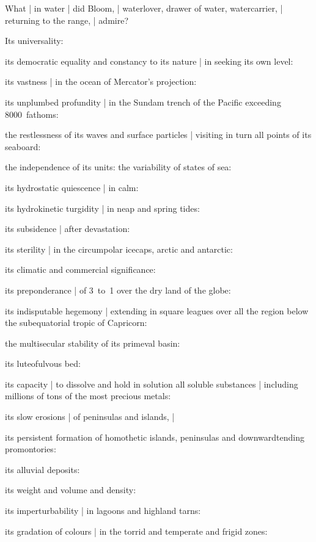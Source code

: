 What |
in water |
did Bloom, |
waterlover, drawer of water, watercarrier, |
returning to the range, |
admire?

\Household
Its universality:

\Philosophy
its democratic equality and constancy to its nature |
in seeking its own level:

\Places
its vastness |
in the ocean of Mercator's projection:

\Religious
its unplumbed profundity |
in the Sundam trench of the Pacific exceeding 8000~fathoms:

\Factual
the restlessness of its waves and surface particles |
visiting in turn all points of its seaboard:

\Memories
the independence of its units:
the variability of states of sea:

\Poetry
its hydrostatic quiescence |
in calm:

\Science
its hydrokinetic turgidity |
in neap and spring tides:

\Household
its subsidence |
after devastation:

\Memories
its sterility |
in the circumpolar icecaps, arctic and antarctic:

\Factual
its climatic and commercial significance:

\Places
its preponderance |
of 3~to~1 over the dry land of the globe:

\Religious
its indisputable hegemony |
extending in square leagues
over all the region below the subequatorial tropic of Capricorn:

\Factual
the multisecular stability of its primeval basin:

\Science
its luteofulvous bed:

\Memories
its capacity |
to dissolve and hold in solution
all soluble substances |
including millions of tons of the most precious metals:

\Household
its slow erosions |
of peninsulas and islands, |

\Places
its persistent formation of homothetic islands,
peninsulas and downwardtending promontories:

\Poetry
its alluvial deposits:

\Philosophy
its weight and volume and density:

\Factual
its imperturbability |
in lagoons and highland tarns:

\Religious
its gradation of colours |
in the torrid and temperate and frigid zones:

